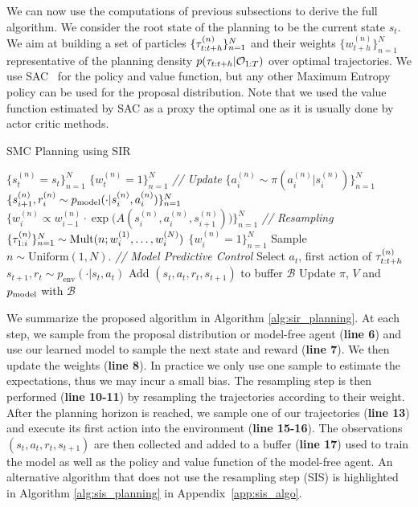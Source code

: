 We can now use the computations of previous subsections to derive the full algorithm. We consider the root state of the planning to be the current state $s_t$. We aim at building a set of particles $\{\tau^{(n)}_{t:t+h}\}_{n=1}^N$  and their weights $\{w^{(n)}_{t+h} \}_{n=1}^N$ representative of the planning density $p(\tau_{t:t+h} | {\mathcal{O}}_{1:T})$ over optimal trajectories. We use SAC~\citep{haarnoja2018soft} for the policy and value function, but any other Maximum Entropy policy can be used for the proposal distribution. Note that we used the value function estimated by SAC as a proxy the optimal one as it is usually done by actor critic methods.




\begin{algorithm}[H]
\caption{SMC Planning using SIR}
\label{alg:sir_planning}
\begin{algorithmic}[1]
\STATE $\{ s^{(n)}_t = s_t\}_{n=1}^N$
\STATE  $\{w^{(n)}_t =1\}_{n=1}^N$
\STATE \textit{// Update}
\STATE $\{a^{(n)}_{i} \sim \pi(a^{(n)}_{i}|s^{(n)}_{i})\}_{n=1}^N$
\STATE $\{s^{(n)}_{i+1}, r^{(n)}_{i} \sim p_{\rm{model}}(\cdot | s^{(n)}_{i}, a^{(n)}_{i})\}_{n=1}^N$
\STATE $\{w_i^{(n)} \propto w^{(n)}_{i-1} \cdot \exp \big( A(s^{(n)}_{i}, a^{(n)}_{i}, s^{(n)}_{i+1}) \big) \}_{n=1}^N$
\STATE \textit{// Resampling}
\STATE $\{\tau^{(n)}_{1:i}\}_{n=1}^N \sim \text{Mult}(n; w_{i}^{(1)}, \ldots, w_{i}^{(N)})$
\STATE $\{w_i^{(n)} =1 \}_{n=1}^N$
\ENDFOR
 \STATE Sample $n \sim \text{Uniform}(1, N)$.
\STATE \textit{// Model Predictive Control}
\STATE Select $a_t$, first action of $\tau^{(n)}_{t:t+h}$
\STATE $s_{t+1}, r_t \sim p_{\text{env}}(\cdot|s_t, a_t)$
\STATE Add $(s_t, a_t, r_t, s_{t+1})$ to buffer $\mathcal{B}$
\STATE Update $\pi$, $V$ and $p_{\rm{model}}$ with $\mathcal{B}$
\ENDFOR
\end{algorithmic}
\end{algorithm}

We summarize the proposed algorithm in Algorithm \ref{alg:sir_planning}. At each step, we sample from the proposal distribution or model-free agent (\textbf{line 6}) and use our learned model to sample the next state and reward (\textbf{line 7}). We then update the  weights (\textbf{line 8}). In practice we only use one sample to estimate the expectations, thus we may incur a small bias. The resampling step is then performed (\textbf{line 10-11}) by resampling the trajectories according to their  weight. After the planning horizon is reached, we sample one of our trajectories (\textbf{line 13}) and execute its first action into the environment (\textbf{line 15-16}). The observations $(s_t, a_t, r_t, s_{t+1})$ are then collected and added to a buffer (\textbf{line 17}) used to train the model as well as the policy and value function of the model-free agent. An alternative algorithm that does not use the resampling step (SIS) is highlighted in Algorithm \ref{alg:sis_planning} in Appendix~\ref{app:sis_algo}.

